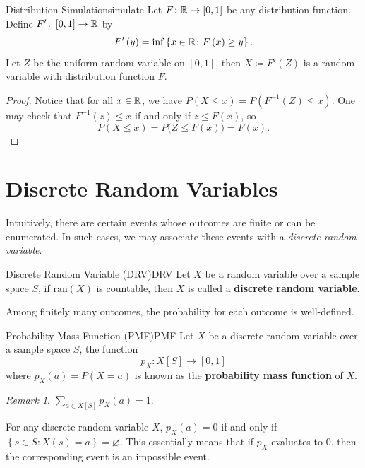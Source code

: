 \documentclass[math]{amznotes}
\theoremstyle{remark}
\newtheorem*{remark}{Remark}
\newcommand{\0}{\mathbf{0}}
\newcommand{\1}{\mathbf{1}}
\begin{document}
\begin{thmbox}{Distribution Simulation}{simulate}
    Let $F \colon \mathbb{R} \to \left[0, 1\right]$ be any distribution function. Define $F' \colon \left[0, 1\right] \to \mathbb{R}$ by
    \begin{equation*}
        F'\left(y\right) = \inf \left\{x \in \mathbb{R} \colon F\left(x\right) \geq y\right\}.
    \end{equation*}
    Let $Z$ be the uniform random variable on $\left[0, 1\right]$, then $X \coloneqq F'\left(Z\right)$ is a random variable with distribution function $F$.
    \tcblower
    \begin{proof}
        Notice that for all $x \in \mathbb{R}$, we have $P\left(X \leq x\right) = P\left(F^{-1}\left(Z\right) \leq x\right)$. One may check that $F^{-1}\left(z\right) \leq x$ if and only if $z \leq F\left(x\right)$, so 
        \begin{equation*}
            P\left(X \leq x\right) = P\bigl(Z \leq F\left(x\right)\bigr) = F\left(x\right).
        \end{equation*}
    \end{proof}
\end{thmbox}
\section{Discrete Random Variables}
Intuitively, there are certain events whose outcomes are finite or can be enumerated. In such cases, we may associate these events with a \textit{discrete random variable}.
\begin{dfnbox}{Discrete Random Variable (DRV)}{DRV}
    Let $X$ be a random variable over a sample space $S$, if $\mathrm{ran}(X)$ is countable, then $X$ is called a {\color{red} \textbf{discrete random variable}}.
\end{dfnbox}
Among finitely many outcomes, the probability for each outcome is well-defined.
\begin{dfnbox}{Probability Mass Function (PMF)}{PMF}
    Let $X$ be a discrete random variable over a sample space $S$, the function
    \begin{displaymath}
        p_X \colon X[S] \to [0, 1]
    \end{displaymath}
    where $p_X(a) = P(X = a)$ is known as the {\color{red} \textbf{probability mass function}} of $X$.
\end{dfnbox}
\begin{notebox}
    \begin{remark}
        $\sum_{a \in X[S]} p_X(a) = 1$.
    \end{remark}
\end{notebox}
For any discrete random variable $X$, $p_X(a) = 0$ if and only if $\left\{s \in S \colon X(s) = a\right\} = \varnothing$. This essentially means that if $p_X$ evaluates to $0$, then the corresponding event is an impossible event.
\end{document}
